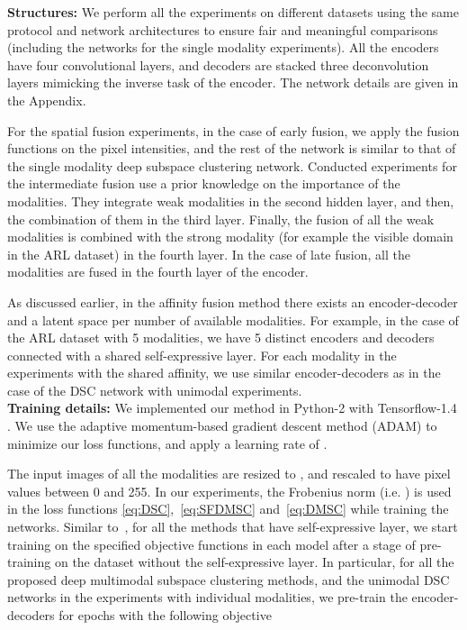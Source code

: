 \documentclass[journal]{IEEEtran}
\begin{document}
\noindent\textbf{Structures: }
We perform all the experiments on different datasets using the same protocol and network architectures to ensure fair and meaningful comparisons (including the networks for the single modality experiments).		 All the encoders have four convolutional layers, and decoders are stacked three deconvolution layers mimicking the inverse task of the encoder.  The network details are given in the Appendix.  

For the spatial fusion experiments, in the case of early fusion, we apply the fusion functions on the pixel intensities, and the rest of the network is similar to that of the single modality deep subspace clustering network.		   Conducted experiments for the intermediate fusion use a prior knowledge on the importance of the modalities.		They integrate weak modalities in the second hidden layer, and then, the combination of them in the third layer.		Finally, the fusion of all the weak modalities is combined with the strong modality (for example the visible domain in the ARL dataset) in the fourth layer.		   In the case of late fusion, all the modalities are fused in the fourth layer of the encoder.   

As discussed earlier, in the affinity fusion method there exists an encoder-decoder and a latent space per number of available modalities. For example, in the case of the ARL dataset with 5 modalities, we have 5 distinct encoders and decoders connected with a shared self-expressive layer. 		 For each modality in the experiments with the shared affinity, we use similar encoder-decoders as in the case of the DSC network \cite{deepsc17nips} with unimodal experiments.\\


\noindent\textbf{Training details: } We implemented our method in Python-2 with Tensorflow-1.4 \cite{abadi2016tensorflow}. We use the adaptive momentum-based gradient descent method (ADAM) \cite{kingma2014adam} to minimize our loss functions, and apply a learning rate of .

The input images of all the modalities are resized to , and rescaled to have pixel values between 0 and 255.  In our experiments, the Frobenius norm (i.e. ) is used in the loss functions \eqref{eq:DSC},~\eqref{eq:SFDMSC} and~\eqref{eq:DMSC} while training the networks.  Similar to~\cite{deepsc17nips}, for all the methods that have self-expressive layer, we start training on the specified objective functions in each model after a stage of pre-training on the dataset without the self-expressive layer.		  In particular, for all the proposed deep multimodal subspace clustering methods, and the unimodal DSC networks in the experiments with individual modalities, we pre-train the encoder-decoders for  epochs with the following objective
 
\end{document}
